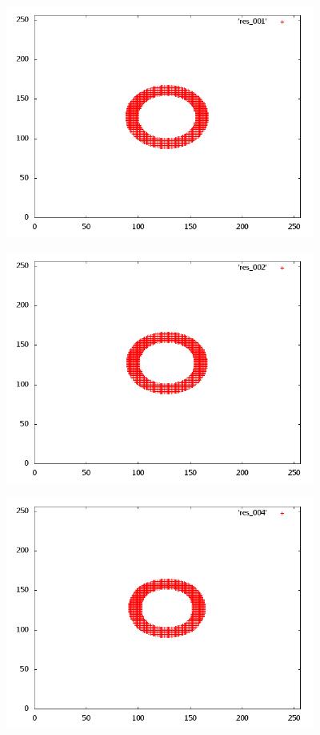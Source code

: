 \begin{center}
\includegraphics[width=4in]{res_001.png}
\end{center}
\begin{center}
\includegraphics[width=4in]{res_002.png}
\end{center}
\begin{center}
\includegraphics[width=4in]{res_004.png}
\end{center}
